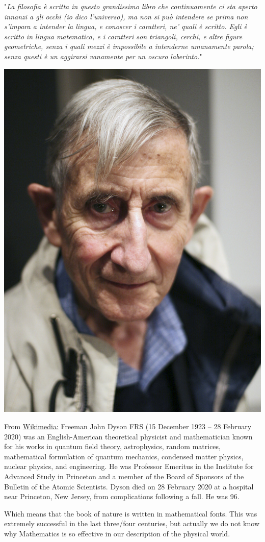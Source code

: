 \documentclass[../main.tex]{subfiles}
\begin{document}
"\textit{La filosofia è scritta in questo grandissimo libro che continuamente ci sta aperto innanzi a gli occhi (io dico l'universo), ma non si può intendere se prima non s'impara a intender la lingua, e conoscer i caratteri, ne' quali è scritto. Egli è scritto in lingua matematica, e i caratteri son triangoli, cerchi, e altre figure geometriche, senza i quali mezzi è impossibile a intenderne umanamente parola; senza questi è un aggirarsi vanamente per un oscuro laberinto.}"
\begin{marginfigure}
	\includegraphics[width=1\linewidth]{images/Freeman_Dyson_(2005).jpeg}
	\caption[Photo of Freeman John Dyson]{From \href{https://commons.wikimedia.org/wiki/File:Freeman_Dyson_(2005).jpg}{Wikimedia:} Freeman John Dyson FRS (15 December 1923 – 28 February 2020) was an English-American theoretical physicist and mathematician known for his works in quantum field theory, astrophysics, random matrices, mathematical formulation of quantum mechanics, condensed matter physics, nuclear physics, and engineering. He was Professor Emeritus in the Institute for Advanced Study in Princeton and a member of the Board of Sponsors of the Bulletin of the Atomic Scientists. Dyson died on 28 February 2020 at a hospital near Princeton, New Jersey, from complications following a fall. He was 96.}
\end{marginfigure}
Which means that the book of nature is written in mathematical fonts. This was extremely successful in the last three/four centuries, but actually we do not know why Mathematics is so effective in our description of the physical world.
\end{document}

